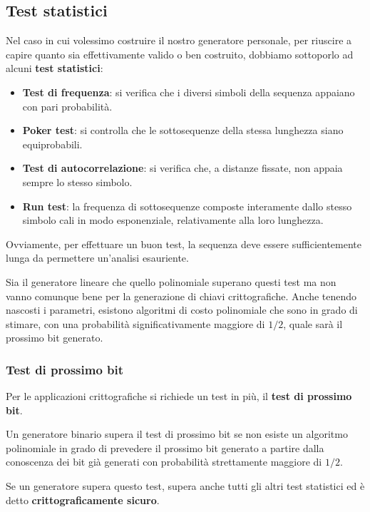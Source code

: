 \subsection{Test statistici}
Nel caso in cui volessimo costruire il nostro generatore personale, per riuscire a capire quanto sia effettivamente
valido o ben costruito, dobbiamo sottoporlo ad alcuni \textbf{test statistici}:
\begin{itemize}
	\item \textbf{Test di frequenza}: si verifica che i diversi simboli della sequenza appaiano con pari probabilit\`a.
	\item \textbf{Poker test}: si controlla che le sottosequenze della stessa lunghezza siano equiprobabili.
	\item \textbf{Test di autocorrelazione}: si verifica che, a distanze fissate, non appaia sempre lo stesso simbolo.
	\item \textbf{Run test}: la frequenza di sottosequenze composte interamente dallo stesso simbolo cali in modo
	      esponenziale, relativamente alla loro lunghezza.
\end{itemize}
Ovviamente, per effettuare un buon test, la sequenza deve essere sufficientemente lunga da permettere un'analisi
esauriente.

Sia il generatore lineare che quello polinomiale superano questi test ma non vanno comunque bene per la generazione di
chiavi crittografiche. Anche tenendo nascosti i parametri, esistono algoritmi di costo polinomiale che sono in grado di
stimare, con una probabilit\`a significativamente maggiore di $1/2$, quale sar\`a il prossimo bit generato.

\subsubsection{Test di prossimo bit}
Per le applicazioni crittografiche si richiede un test in pi\`u, il \textbf{test di prossimo bit}.

Un generatore binario supera il test di prossimo bit se non esiste un algoritmo polinomiale in grado di prevedere il
prossimo bit generato a partire dalla conoscenza dei bit gi\`a generati con probabilit\`a strettamente maggiore di $1/2$.

Se un generatore supera questo test, supera anche tutti gli altri test statistici ed \`e detto
\textbf{crittograficamente sicuro}.


